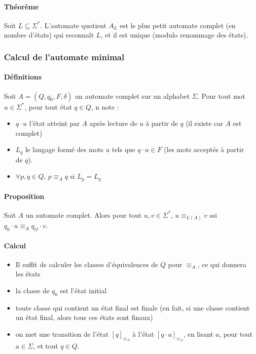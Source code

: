 \documentclass[a4paper]{article}
\begin{document}
  \paragraph{Théorème} Soit $L \subseteq \Sigma^*$. L'automate quotient $A_L$ est
  le plus petit automate complet (en nombre d'états) qui reconnaît $L$, et il est 
  unique (modulo renommage des états).

  \subsubsection{Calcul de l'automate minimal}
  \paragraph{Définitions}
  Soit $A = (Q, q_0, F, \delta)$ un automate complet sur un alphabet $\Sigma$. 
  Pour tout mot $u \in \Sigma^*$, pour tout état $q \in Q$, n note :
  \begin{itemize}
    \item $q \cdot u$ l'état atteint par $A$ après lecture de $u$ à partir de $q$
    (il existe car $A$ est complet)
    \item $L_q$ le langage formé des mots $u$ tels que $q\cdot u \in F$ (les mots
    acceptés à partir de $q$).
    \item $\forall p,q\in Q$, $p \equiv_A q$ si $L_p = L_q$
  \end{itemize}

  \paragraph{Proposition} Soit $A$ un automate complet. Alors pour tout $u,v \in \Sigma^*$,
  $u \equiv_{L(A)} v$ ssi $q_0 \cdot u \equiv_A q_O \cdot v$.

  \paragraph{Calcul}
  \begin{itemize}
    \item Il suffit de calculer les classes d'équivalences de $Q$ pour $\equiv_A$, 
    ce qui donnera les états
    \item la classe de $q_0$ est l'état initial
    \item toute classe qui contient un état final est finale (en fait, si une classe
    contient un état final, alors tous ces états sont finaux)
    \item on met une transition de l'état $[q]_{\equiv_A}$ à l'état $[q \cdot a]_{\equiv_A}$,
    en lisant $a$, pour tout $a \in \Sigma$, et tout $q \in Q$.
  \end{itemize}
  
\end{document}

